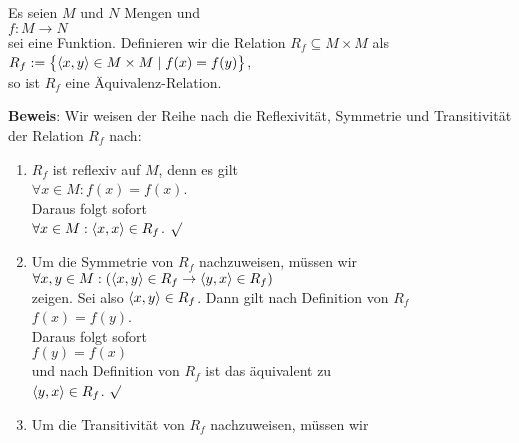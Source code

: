 \begin{Satz} Es seien $M$ und $N$ Mengen und 
\\[0.2cm]
\hspace*{1.3cm}
$f : M \rightarrow N$
\\[0.2cm]
sei eine Funktion.  Definieren wir die Relation $R_f \subseteq M \times M$ als
\\[0.2cm]
\hspace*{1.3cm}
$R_f := \bigl\{ \pair(x,y) \in M \times M \mid f(x) = f(y) \bigr\}$,
\\[0.2cm]
so ist $R_f$ eine \"{A}quivalenz-Relation.  
\end{Satz}


\noindent
\textbf{Beweis}: Wir weisen der Reihe nach die Reflexivit\"{a}t, Symmetrie und Transitivit\"{a}t der Relation $R_f$ nach:
\begin{enumerate}
\item $R_f$ ist reflexiv auf $M$, denn es gilt 
      \\[0.2cm]
      \hspace*{1.3cm}
      $\forall x \in M: f(x) = f(x)$.
      \\[0.2cm]
      Daraus folgt sofort 
      \\[0.2cm]
      \hspace*{1.3cm}
      $\forall x \in M: \pair(x,x) \in R_f$. $\surd$
\item Um die Symmetrie von $R_f$ nachzuweisen, m\"{u}ssen wir
      \\[0.2cm]
      \hspace*{1.3cm}
      $\forall x,y \in M: (\pair(x,y) \in R_f \rightarrow \pair(y,x) \in R_f)$
      \\[0.2cm]
      zeigen.  Sei also $\pair(x,y) \in R_f$. Dann gilt nach Definition von $R_f$
      \\[0.2cm]
      \hspace*{1.3cm}
      $f(x) = f(y)$.
      \\[0.2cm]
      Daraus folgt sofort 
      \\[0.2cm]
      \hspace*{1.3cm}
      $f(y) = f(x)$
      \\[0.2cm]
      und nach Definition von $R_f$ ist das \"{a}quivalent zu 
      \\[0.2cm]
      \hspace*{1.3cm}
      $\pair(y,x) \in R_f$. $\surd$
\item Um die Transitivit\"{a}t von $R_f$ nachzuweisen, m\"{u}ssen wir 
      \\[0.2cm]

\end{enumerate}
